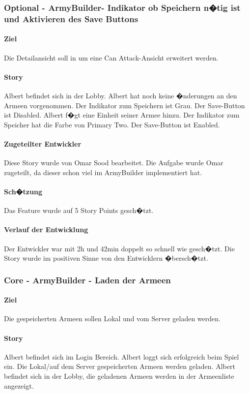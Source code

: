 \documentclass[12pt, titlepage]{scrartcl}
\begin{document}
			\subsubsection{Optional - ArmyBuilder- Indikator ob Speichern n�tig ist und Aktivieren des Save Buttons}
			\paragraph{Ziel} Die Detailansicht soll in um eine \glqq Can Attack\grqq-Ansicht erweitert werden.
			\paragraph{Story} Albert befindet sich in der Lobby. Albert hat noch keine �nderungen an den Armeen vorgenommen. Der Indikator zum Speichern ist Grau. Der Save-Button ist Disabled. Albert f�gt eine Einheit seiner Armee hinzu. Der Indikator zum Speicher hat die Farbe von Primary Two. Der Save-Button ist Enabled.
			\paragraph{Zugeteilter Entwickler} Diese Story wurde von Omar Sood bearbeitet. Die Aufgabe wurde Omar zugeteilt, da dieser schon viel im ArmyBuilder implementiert hat.
			\paragraph{Sch�tzung}
			Das Feature wurde auf 5 Story Points gesch�tzt.
			\paragraph{Verlauf der Entwicklung} 
			Der Entwickler war mit 2h und 42min doppelt so schnell wie gesch�tzt. Die Story wurde im positiven Sinne von den Entwicklern �bersch�tzt.
			\subsubsection{Core - ArmyBuilder - Laden der Armeen}
			\paragraph{Ziel} Die gespeicherten Armeen sollen Lokal und vom Server geladen werden.
			\paragraph{Story} Albert befindet sich im Login Bereich. Albert loggt sich erfolgreich beim Spiel ein. Die Lokal/auf dem Server gespeicherten Armeen werden geladen. Albert befindet sich in der Lobby, die geladenen Armeen werden in der Armeenliste angezeigt.
\end{document}
